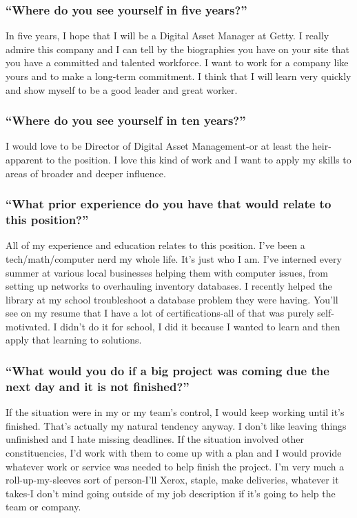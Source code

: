 \subsubsection*{``Where do you see yourself in five years?''}
\break In five years, I hope that I will be a Digital Asset Manager at Getty. I really admire this company and I can tell by the biographies you have on your site that you have a committed and talented workforce. I want to work for a company like yours and to make a long-term commitment. I think that I will learn very quickly and show myself to be a good leader and great worker.

\subsubsection*{``Where do you see yourself in ten years?''}
\break I would love to be Director of Digital Asset Management-or at least the heir-apparent to the position. I love this kind of work and I want to apply my skills to areas of broader and deeper influence.

\subsubsection*{``What prior experience do you have that would relate to this position?''}
\break All of my experience and education relates to this position. I've been a tech/math/computer nerd my whole life. It's just who I am. I've interned every summer at various local businesses helping them with computer issues, from setting up networks to overhauling inventory databases. I recently helped the library at my school troubleshoot a database problem they were having. You'll see on my resume that I have a lot of certifications-all of that was purely self-motivated. I didn't do it for school, I did it because I wanted to learn and then apply that learning to solutions.

\subsubsection*{``What would you do if a big project was coming due the next day and it is not finished?''}
\break If the situation were in my or my team's control, I would keep working until it's finished. That's actually my natural tendency anyway. I don't like leaving things unfinished and I hate missing deadlines. If the situation involved other constituencies, I'd work with them to come up with a plan and I would provide whatever work or service was needed to help finish the project. I'm very much a roll-up-my-sleeves sort of person-I'll Xerox, staple, make deliveries, whatever it takes-I don't mind going outside of my job description if it's going to help the team or company.

